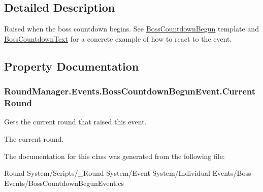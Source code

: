\subsection{Detailed Description}
Raised when the boss countdown begins. See \hyperlink{class_round_manager_1_1_boss_countdown_begun}{Boss\+Countdown\+Begun} template and \hyperlink{class_round_manager_1_1_boss_countdown_text}{Boss\+Countdown\+Text} for a concrete example of how to react to the event. 



\subsection{Property Documentation}
\hypertarget{class_round_manager_1_1_events_1_1_boss_countdown_begun_event_ab222f79d5e16d452c0da7b5b8ba19a79}{}
\subsubsection[{Current\+Round}]{ Round\+Manager.\+Events.\+Boss\+Countdown\+Begun\+Event.\+Current\+Round\hspace{0.3cm}{\ttfamily [get]}}\label{class_round_manager_1_1_events_1_1_boss_countdown_begun_event_ab222f79d5e16d452c0da7b5b8ba19a79}


Gets the current round that raised this event. 

The current round.

The documentation for this class was generated from the following file\+:\begin{DoxyCompactItemize}
\item 
Round System/\+Scripts/\+\_\+\+Round System/\+Event System/\+Individual Events/\+Boss Events/Boss\+Countdown\+Begun\+Event.\+cs\end{DoxyCompactItemize}
